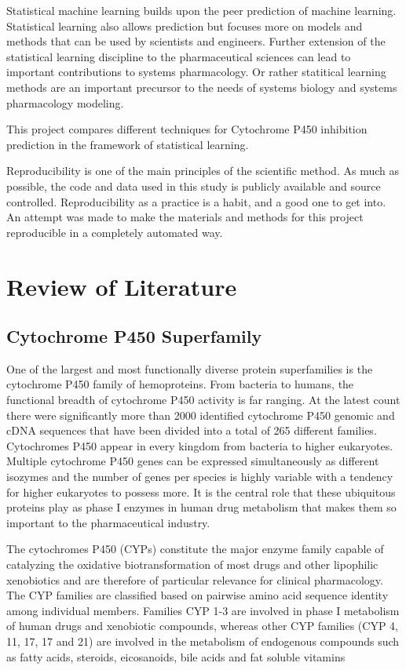 Statistical machine learning builds upon the peer prediction of machine learning. Statistical learning also allows prediction but focuses more on models and methods that can be used by scientists and engineers.\cite{James2013} Further extension of the statistical learning discipline to the pharmaceutical sciences can lead to important contributions to systems pharmacology. Or rather statitical learning methods are an important precursor to the needs of systems biology and systems pharmacology modeling.

This project compares different techniques for Cytochrome P450 inhibition prediction in the framework of statistical learning. 

Reproducibility is one of the main principles of the scientific method. As much as possible, the code and data used in this study is publicly available and source controlled. Reproducibility as a practice is a habit, and a good one to get into. An attempt was made to make the materials and methods for this project reproducible in a completely automated way. 

\section{Review of Literature}
\subsection{Cytochrome P450 Superfamily}

One of the largest and most functionally diverse protein superfamilies is the cytochrome P450 family of hemoproteins. From bacteria to humans, the functional breadth of cytochrome P450 activity is far ranging. At the latest count there were significantly more than 2000 identified cytochrome P450 genomic and cDNA sequences that have been divided into a total of 265 different families.\cite{Danielson2002} Cytochromes P450 appear in every kingdom from bacteria to higher eukaryotes. Multiple cytochrome P450 genes can be expressed simultaneously as different isozymes and the number of genes per species is highly variable with a tendency for higher eukaryotes to possess more. It is the central role that these ubiquitous proteins play as phase I enzymes in human drug metabolism that makes them so important to the pharmaceutical industry.
 
The cytochromes P450 (CYPs) constitute the major enzyme family capable of catalyzing the oxidative biotransformation of most drugs and other lipophilic xenobiotics and are therefore of particular relevance for clinical pharmacology. The CYP families are classified based on pairwise amino acid sequence identity among individual members. Families CYP 1-3 are involved in phase I metabolism of human drugs and xenobiotic compounds, whereas other CYP families (CYP 4, 11, 17, 17 and 21) are involved in the metabolism of endogenous compounds such as fatty acids, steroids, eicosanoids, bile acids and fat soluble vitamins\cite{Singh2011}

